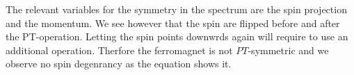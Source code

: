 \documentclass[../main.tex]{main.tex}
\begin{document}
\begin{figure}[H]

\end{figure}
The relevant variables for the symmetry in the spectrum are the spin projection and the momentum. We see however that the spin are flipped before and after the PT-operation.
Letting the spin points downwrds again will require to use an additional operation. Therfore the ferromagnet is not $PT$-symmetric and we observe no spin degenrancy as the
equation shows it.\\
\end{document}

